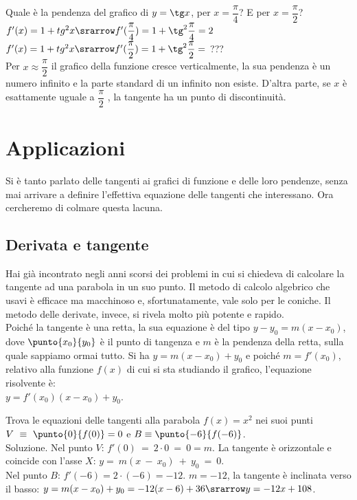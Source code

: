 \begin {esempio}
Quale è la pendenza del grafico di $y=\tg x$, per $x=\dfrac{\pi}{4}$? E per
$x=\dfrac{\pi}{2}$?\\
$f'(x)=1+tg^2 x\srarrow f'(\dfrac{\pi}{4})=1+\tg^2\dfrac{\pi}{4}=2$\\
$f'(x)=1+tg^2 x\srarrow f'(\dfrac{\pi}{2})=1+\tg^2\dfrac{\pi}{2}=$ ???\\
Per $x\approx\dfrac{\pi}{2}$ il grafico della funzione cresce verticalmente,
la sua pendenza è un numero infinito e la parte standard di un infinito non
esiste. D'altra parte, se $x$ è esattamente uguale a $\dfrac{\pi}{2}$ ,
la tangente ha un punto di discontinuità.
\end {esempio}


\section{Applicazioni}
\label{sec:diff01_applicazioni}
Si è tanto parlato delle tangenti ai grafici di funzione e delle loro pendenze,
senza mai arrivare a definire l'effettiva equazione delle tangenti che
interessano. Ora cercheremo di colmare questa lacuna.

\subsection{Derivata e tangente}
 Hai già incontrato negli anni scorsi dei problemi in cui si chiedeva di 
 calcolare la tangente ad una parabola in un suo punto. Il metodo di calcolo 
 algebrico che usavi è efficace ma macchinoso e, sfortunatamente, vale solo 
 per le coniche. Il metodo delle derivate, invece, si rivela
 molto più potente e rapido.\\
 Poiché la tangente è una retta, la sua equazione è del tipo $y-y_0=m(x-x_0)$, 
 dove  $\punto{x_0}{y_0}$ è il punto di tangenza 
 e $m$ è la pendenza della retta, sulla quale sappiamo ormai tutto.
 Si ha $y=m(x-x_0)+y_0$ e poiché $m=f'(x_0)$, relativo alla funzione $f(x)$
 di cui si sta studiando il grafico, l'equazione risolvente è:\\
 $y=f'(x_0)(x-x_0)+y_0$.
 
\begin{esempio}
  Trova le equazioni delle tangenti alla parabola $f(x)=x^2$ nei suoi punti
  $V~\equiv~\punto{0}{f(0)}=0$ e $B\equiv\punto{-6}{f(-6)}$.\\
  Soluzione. Nel punto $V$: $f'(0)~=~2\cdot 0~=~0=m$. La tangente è 
  orizzontale e coincide con l'asse $X$: $y=~m(x~-~x_0)~+~y_0~=~0$.\\
  Nel punto $B$: $f'(-6)=2\cdot (-6)=-12$. $m=-12$, la tangente è inclinata
  verso il basso:
  $y=m(x-x_0)+y_0= -12(x-6)+36\srarrow y=-12x+108$.
 \end{esempio}
 
